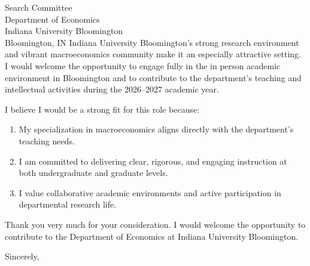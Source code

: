 \documentclass[11pt,letterpaper]{letter}
\begin{document}
\begin{letter}{
Search Committee \\
Department of Economics \\
Indiana University Bloomington \\
Bloomington, IN
}
Indiana University Bloomington’s strong research environment and vibrant macroeconomics community make it an especially attractive setting. I would welcome the opportunity to engage fully in the in person academic environment in Bloomington and to contribute to the department’s teaching and intellectual activities during the 2026–2027 academic year.

I believe I would be a strong fit for this role because:
\begin{enumerate}
    \item My specialization in macroeconomics aligns directly with the department’s teaching needs.
    \item I am committed to delivering clear, rigorous, and engaging instruction at both undergraduate and graduate levels.
    \item I value collaborative academic environments and active participation in departmental research life.
\end{enumerate}

Thank you very much for your consideration. I would welcome the opportunity to contribute to the Department of Economics at Indiana University Bloomington.

\closing{Sincerely,}

\end{letter}
\end{document}
